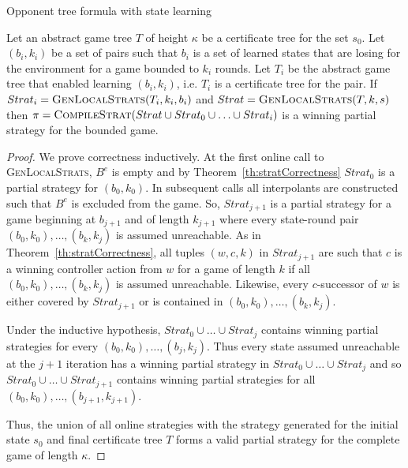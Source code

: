 \begin{algorithm}
    \caption{Opponent tree formula with state learning}
    \label{alg:stratTreeFml}
    \begin{algorithmic}[1]
        \State {}
        \Else
        \State {}
        \EndIf
        \EndFunction
    \end{algorithmic}
\end{algorithm}

\begin{theorem}
    Let an abstract game tree $T$ of height $\kappa$ be a certificate tree for the set $s_0$. Let $(b_i, k_i)$ be a set of pairs such that $b_i$ is a set of learned states that are losing for the environment for a game bounded to $k_i$ rounds. Let $T_i$ be the abstract game tree that enabled learning $(b_i, k_i)$, i.e. $T_i$ is a certificate tree for the pair. If $Strat_i = \textsc{GenLocalStrats}(T_i, k_i, b_i)$ and $Strat = \textsc{GenLocalStrats}(T, k, s)$ then $\pi = \textsc{CompileStrat}(Strat \cup Strat_0 \cup \ldots \cup Strat_i)$ is a winning partial strategy for the bounded game.
\end{theorem}
\begin{proof}
    We prove correctness inductively. At the first online call to \textsc{GenLocalStrats}, $B^e$ is empty and by Theorem~\ref{th:stratCorrectness} $Strat_0$ is a partial strategy for $(b_0, k_0)$. In subsequent calls all interpolants are constructed such that $B^e$ is excluded from the game. So, $Strat_{j+1}$ is a partial strategy for a game beginning at $b_{j+1}$ and of length $k_{j+1}$ where every state-round pair $(b_0, k_0), \ldots, (b_k, k_j)$ is assumed unreachable. As in Theorem~\ref{th:stratCorrectness}, all tuples $(w, c, k)$ in $Strat_{j+1}$ are such that $c$ is a winning controller action from $w$ for a game of length $k$ if all $(b_0, k_0), \ldots, (b_k, k_j)$ is assumed unreachable. Likewise, every $c$-successor of $w$ is either covered by $Strat_{j+1}$ or is contained in $(b_0, k_0), \ldots, (b_k, k_j)$.

    Under the inductive hypothesis, $Strat_0 \cup \ldots \cup Strat_j$ contains winning partial strategies for every $(b_0, k_0), \ldots, (b_j, k_j)$. Thus every state assumed unreachable at the $j+1$ iteration has a winning partial strategy in $Strat_0 \cup \ldots \cup Strat_j$ and so $Strat_0 \cup \ldots \cup Strat_{j+1}$ contains winning partial strategies for all $(b_0, k_0), \ldots, (b_{j+1}, k_{j+1})$.

    Thus, the union of all online strategies with the strategy generated for the initial state $s_0$ and final certificate tree $T$ forms a valid partial strategy for the complete game of length $\kappa$.
\end{proof}

